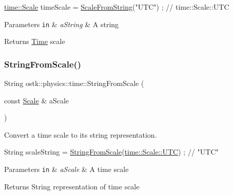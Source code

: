 \begin{DoxyCode}
\hyperlink{namespaceostk_1_1physics_1_1time_adf23d37bd8641fb76a0e98ab46a70df7}{time::Scale} timeScale = \hyperlink{namespaceostk_1_1physics_1_1time_a2c5cdf23bd0ca664bc0c033e4d005d6c}{ScaleFromString}(\textcolor{stringliteral}{"UTC"}) ; \textcolor{comment}{// time::Scale::UTC}
\end{DoxyCode}



\begin{DoxyParams}[1]{Parameters}
\mbox{\tt in}  & {\em a\+String} & A string \\
\hline
\end{DoxyParams}
\begin{DoxyReturn}{Returns}
\hyperlink{classostk_1_1physics_1_1time_1_1_time}{Time} scale 
\end{DoxyReturn}
\mbox{\label{namespaceostk_1_1physics_1_1time_a92dcdd4abdad01b1f9a2e76560158088}} 
\subsubsection{\texorpdfstring{String\+From\+Scale()}{StringFromScale()}}
{\footnotesize\ttfamily String ostk\+::physics\+::time\+::\+String\+From\+Scale (\begin{DoxyParamCaption}\item[{const \hyperlink{namespaceostk_1_1physics_1_1time_adf23d37bd8641fb76a0e98ab46a70df7}{Scale} \&}]{a\+Scale }\end{DoxyParamCaption})}



Convert a time scale to its string representation. 


\begin{DoxyCode}
String scaleString = \hyperlink{namespaceostk_1_1physics_1_1time_a92dcdd4abdad01b1f9a2e76560158088}{StringFromScale}(\hyperlink{namespaceostk_1_1physics_1_1time_adf23d37bd8641fb76a0e98ab46a70df7a9234324ddf6b4176b57d803a925b7961}{time::Scale::UTC}) ; \textcolor{comment}{// "UTC"}
\end{DoxyCode}



\begin{DoxyParams}[1]{Parameters}
\mbox{\tt in}  & {\em a\+Scale} & A time scale \\
\hline
\end{DoxyParams}
\begin{DoxyReturn}{Returns}
String representation of time scale 
\end{DoxyReturn}
